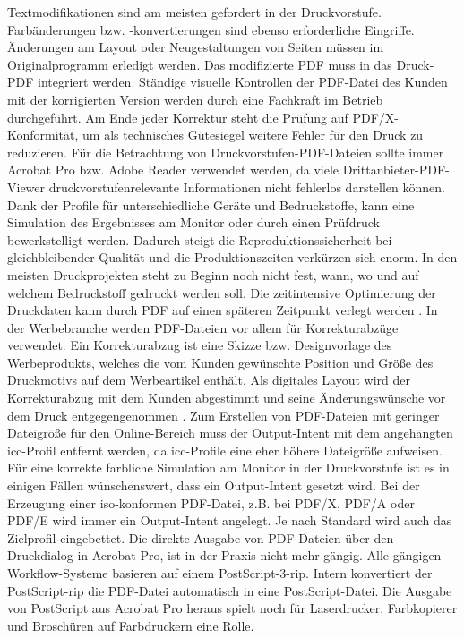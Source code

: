 Textmodifikationen sind am meisten gefordert in der Druckvorstufe. Farbänderungen bzw. -konvertierungen sind ebenso erforderliche Eingriffe. Änderungen am Layout oder Neugestaltungen von Seiten müssen im Originalprogramm erledigt werden. Das modifizierte PDF muss in das Druck-PDF integriert werden. Ständige visuelle Kontrollen der PDF-Datei des Kunden mit der korrigierten Version werden durch eine Fachkraft im Betrieb durchgeführt. Am Ende jeder Korrektur steht die Prüfung auf PDF/X-Konformität, um als technisches Gütesiegel weitere Fehler für den Druck zu reduzieren. Für die Betrachtung von Druckvorstufen-PDF-Dateien sollte immer Acrobat Pro bzw. Adobe Reader verwendet werden, da viele Drittanbieter-PDF-Viewer druckvorstufenrelevante Informationen nicht fehlerlos darstellen können. Dank der Profile für unterschiedliche Geräte und Bedruckstoffe, kann eine Simulation des Ergebnisses am Monitor oder durch einen Prüfdruck bewerkstelligt werden. Dadurch steigt die Reproduktionssicherheit bei gleichbleibender Qualität und die Produktionszeiten verkürzen sich enorm. In den meisten Druckprojekten steht zu Beginn noch nicht fest, wann, wo und auf welchem Bedruckstoff gedruckt werden soll. Die zeitintensive Optimierung der Druckdaten kann durch PDF auf einen späteren Zeitpunkt verlegt werden \cite{schneeberger}. In der Werbebranche werden PDF-Dateien vor allem für Korrekturabzüge verwendet. Ein Korrekturabzug ist eine Skizze bzw. Designvorlage des Werbeprodukts, welches die vom Kunden gewünschte Position und Größe des Druckmotivs auf dem Werbeartikel enthält. Als digitales Layout wird der Korrekturabzug mit dem Kunden abgestimmt und seine Änderungswünsche vor dem Druck entgegengenommen \cite{korrektur}. Zum Erstellen von PDF-Dateien mit geringer Dateigröße für den Online-Bereich muss der Output-Intent mit dem angehängten \gls{icc}-Profil entfernt werden, da \gls{icc}-Profile eine eher höhere Dateigröße aufweisen. Für eine korrekte farbliche Simulation am Monitor in der Druckvorstufe ist es in einigen Fällen wünschenswert, dass ein Output-Intent gesetzt wird. Bei der Erzeugung einer \gls{iso}-konformen PDF-Datei, z.B. bei PDF/X, PDF/A oder PDF/E wird immer ein Output-Intent angelegt. Je nach Standard wird auch das Zielprofil eingebettet. Die direkte Ausgabe von PDF-Dateien über den Druckdialog in Acrobat Pro, ist in der Praxis nicht mehr gängig. Alle gängigen Workflow-Systeme basieren auf einem PostScript-3-\gls{rip}. Intern konvertiert der PostScript-\gls{rip} die PDF-Datei automatisch in eine PostScript-Datei. Die Ausgabe von PostScript aus Acrobat Pro heraus spielt noch für Laserdrucker, Farbkopierer und Broschüren auf Farbdruckern eine Rolle. \\

